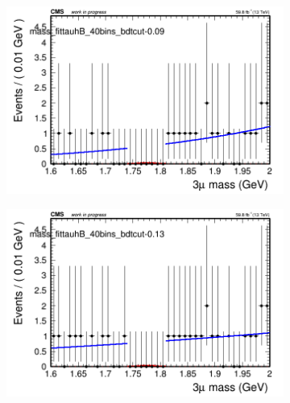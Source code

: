 \begin{figure}[H]
\begin{subfigure}{0.2\textwidth}
        \caption{}
    \end{subfigure}
    \begin{subfigure}{0.2\textwidth}
        \includegraphics[width=\textwidth]{power_law/plots/tauhB/massfit_tauhB_40bins_bdtcut-0.09.png}
        \caption{}
    \end{subfigure}
    \begin{subfigure}{0.2\textwidth}
        \includegraphics[width=\textwidth]{power_law/plots/tauhB/massfit_tauhB_40bins_bdtcut-0.13.png}
        \caption{}
    \end{subfigure}
    \begin{subfigure}{0.2\textwidth}

\end{subfigure}
\end{figure}
